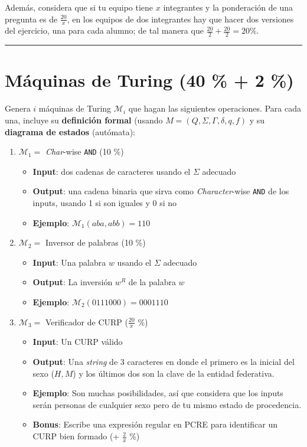 \documentclass[8pt, onside]{article}
\begin{document}
Además, considera que si tu equipo tiene $x$ integrantes y la ponderación de una pregunta es de $\frac{20}{x}$, en los equipos de dos integrantes hay que hacer dos versiones del ejercicio, una para cada alumno;
de tal manera que $\frac{20}{2} + \frac{20}{2} = 20 \%$.

\rule{\textwidth}{0.1mm}

\section{Máquinas de Turing (40 \% + 2 \%)}

Genera $i$ máquinas de Turing $\mathcal{M}_i$ que hagan las siguientes operaciones.
Para cada una, incluye su \textbf{definición formal} (usando $M = (Q,\Sigma,\Gamma,\delta,q,f)$ y su \textbf{diagrama de estados} (autómata):

\begin{enumerate}[label=\tt \alph*)]
    \itemsep0em
    \item $\mathcal{M}_1 =$ \textit{Char}-wise \texttt{AND} (10 \%)
    \begin{itemize}
        \item \textbf{Input}: dos cadenas de caracteres usando el $\Sigma$ adecuado
        \item \textbf{Output}: una cadena binaria que sirva como \textit{Character}-wise \texttt{AND} de los inputs, usando 1 si son iguales y 0 si no
        \item \textbf{Ejemplo}: $\mathcal{M}_1(aba,abb) = 110$
    \end{itemize}
    \pagebreak
    \item $\mathcal{M}_2 = $ Inversor de palabras (10 \%)
    \begin{itemize}
        \item \textbf{Input}: Una palabra $w$ usando el $\Sigma$ adecuado
        \item \textbf{Output}: La inversión $w^R$ de la palabra $w$
        \item \textbf{Ejemplo}: $\mathcal{M}_2(0111000) = 0001110$
    \end{itemize}
    \item $\mathcal{M}_3 = $ Verificador de CURP ($\frac{20}{x}$ \%)
    \begin{itemize}
        \item \textbf{Input}: Un CURP válido
        \item \textbf{Output}: Una \textit{string} de 3 caracteres en donde el primero es la inicial del sexo ($H, M$) y los últimos dos son la clave de la entidad federativa.
        \item \textbf{Ejemplo}: Son muchas posibilidades, así que considera que los inputs serán personas de cualquier sexo pero de tu mismo estado de procedencia.
        \item \textbf{Bonus}: Escribe una expresión regular en PCRE para identificar un CURP bien formado (+ $\frac{2}{x}$ \%)
    \end{itemize}
\end{enumerate}
\end{document}
